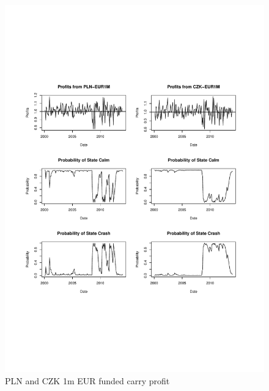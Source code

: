 \documentclass[12pt, a4paper, oneside]{article} %
\begin{document}
\begin{figure}[!h]
\centering
\caption{PLN and CZK 1m EUR funded carry profit}
\includegraphics[scale = .75]{../Figures/2RegProb/PLNCZKEUR.pdf}
\end{figure}
\end{document}
